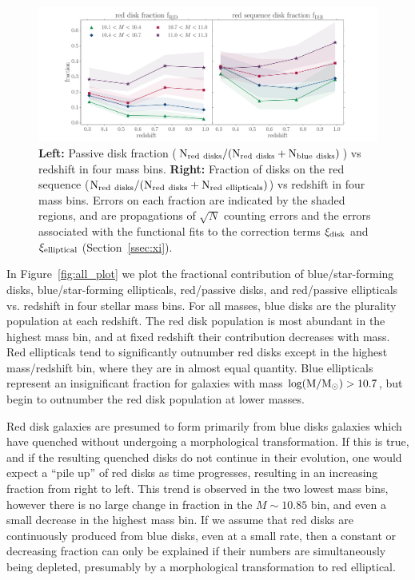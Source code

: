 \documentclass[useAMS,usenatbib]{mn2e}
\begin{document}
\begin{figure}
\centering
\includegraphics[width=\textwidth,trim={0cm 0cm 2cm 1cm},clip]{figures/red_disk_fractions.pdf}
\caption{\textbf{Left:} Passive disk fraction ($\rm N_{red~disks}/(N_{red~disks}+N_{blue~disks})$) vs redshift in four mass bins. \textbf{Right:} Fraction of disks on the red sequence ($\rm N_{red~disks}/(N_{red~disks}+N_{red~ellipticals})$) vs redshift in four mass bins. Errors on each fraction are indicated by the shaded regions, and are propagations of $\sqrt{N}$ counting errors and the errors associated with the functional fits to the correction terms $\xi_{\rm disk}$ and $\xi_{\rm elliptical}$ (Section~\ref{ssec:xi}).} 
\label{fig:f_results}
\end{figure}


In Figure~\ref{fig:all_plot} we plot the fractional contribution of blue/star-forming disks, blue/star-forming ellipticals, red/passive disks, and red/passive ellipticals vs. redshift in four stellar mass bins. For all masses, blue disks are the plurality population at each redshift. The red disk population is most abundant in the highest mass bin, and at fixed redshift their contribution decreases with mass. Red ellipticals tend to significantly outnumber red disks except in the highest mass/redshift bin, where they are in almost equal quantity. Blue ellipticals represent an insignificant fraction for galaxies with mass $\rm log(M/M_{\odot})>10.7$, but begin to outnumber the red disk population at lower masses. 


Red disk galaxies are presumed to form primarily from blue disks galaxies which have quenched without undergoing a morphological transformation. If this is true, and if the resulting quenched disks do not continue in their evolution, one would expect a ``pile up'' of red disks as time progresses, resulting in an increasing fraction from right to left. This trend is observed in the two lowest mass bins, however there is no large change in fraction in the $M\sim10.85$ bin, and even a small decrease in the highest mass bin. If we assume that red disks are continuously produced from blue disks, even at a small rate, then a constant or decreasing fraction can only be explained if their numbers are simultaneously being depleted, presumably by a morphological transformation to red elliptical.
\end{document}
